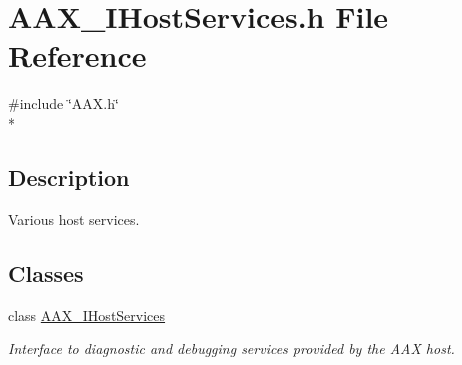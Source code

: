 \hypertarget{a00251}{}\section{A\+A\+X\+\_\+\+I\+Host\+Services.\+h File Reference}
\label{a00251}
{\ttfamily \#include \char`\"{}A\+A\+X.\+h\char`\"{}}\\*


\subsection{Description}
Various host services. 

\subsection*{Classes}
\begin{DoxyCompactItemize}
\item 
class \hyperlink{a00103}{A\+A\+X\+\_\+\+I\+Host\+Services}
\begin{DoxyCompactList}\small\item\em Interface to diagnostic and debugging services provided by the A\+A\+X host. \end{DoxyCompactList}\end{DoxyCompactItemize}
